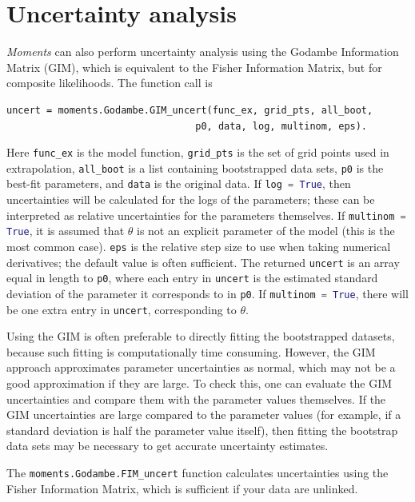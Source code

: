 \documentclass[12pt]{article}
\makeatletter
\newcommand{\py}[1]{\lstinline[language=Python, showstringspaces=False]@#1@}
\makeatother
\begin{document}
\section{Uncertainty analysis}
\textit{Moments} can also perform uncertainty analysis using the Godambe Information Matrix (GIM), which is equivalent to the Fisher Information Matrix, but for composite likelihoods.
The function call is
\begin{lstlisting}
uncert = moments.Godambe.GIM_uncert(func_ex, grid_pts, all_boot,
                                 p0, data, log, multinom, eps).
\end{lstlisting}
Here \py{func_ex} is the model function, \py{grid_pts} is the set of grid points used in extrapolation, \py{all_boot} is a list containing bootstrapped data sets, \py{p0} is the best-fit parameters, and \py{data} is the original data.
If \py{log = True}, then uncertainties will be calculated for the logs of the parameters; these can be interpreted as relative uncertainties for the parameters themselves.
If \py{multinom = True}, it is assumed that $\theta$ is not an explicit parameter of the model (this is the most common case).
\py{eps} is the relative step size to use when taking numerical derivatives; the default value is often sufficient.
The returned \py{uncert} is an array equal in length to \py{p0}, where each entry in \py{uncert} is the estimated standard deviation of the parameter it corresponds to in \py{p0}.
If \py{multinom = True}, there will be one extra entry in \py{uncert}, corresponding to $\theta$.

Using the GIM is often preferable to directly fitting the bootstrapped datasets, because such fitting is computationally time consuming.
However, the GIM approach approximates parameter uncertainties as normal, which may not be a good approximation if they are large.
To check this, one can evaluate the GIM uncertainties and compare them with the parameter values themselves.
If the GIM uncertainties are large compared to the parameter values (for example, if a standard deviation is half the parameter value itself), then fitting the bootstrap data sets may be necessary to get accurate uncertainty estimates.

The \py{moments.Godambe.FIM_uncert} function calculates uncertainties using the Fisher Information Matrix, which is sufficient if your data are unlinked.
\end{document}
